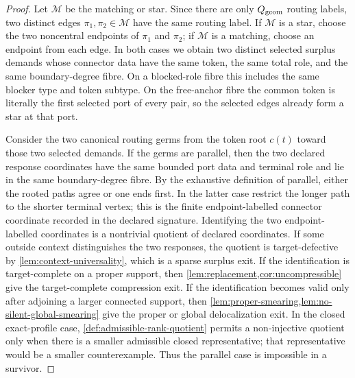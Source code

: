 \documentclass[11pt]{article}
\begin{document}
\begin{proof}
Let \(\mathcal M\) be the matching or star.  Since there are only
\(Q_{\rm geom}\) routing labels, two distinct edges
\(\pi_1,\pi_2\in\mathcal M\) have the same routing label.  If \(\mathcal M\) is
a star, choose the two noncentral endpoints of \(\pi_1\) and \(\pi_2\); if
\(\mathcal M\) is a matching, choose an endpoint from each edge.  In both cases
we obtain two distinct selected surplus demands whose connector data have the
same token, the same total role, and the same boundary-degree fibre.  On a
blocked-role fibre this includes the same blocker type and token subtype.  On
the free-anchor fibre the common token is literally the first selected port
of every pair, so the selected edges already form a star at that port.

Consider the two canonical routing germs from the token root \(c(t)\) toward
those two selected demands.  If the germs are parallel, then the two declared response
coordinates have the same bounded port data and terminal role and lie in the
same boundary-degree fibre.  By the exhaustive definition of parallel, either
the rooted paths agree or one ends first.  In the latter case restrict the
longer path to the shorter terminal vertex; this is the finite
endpoint-labelled connector coordinate recorded in the declared signature.
Identifying the two endpoint-labelled coordinates is a nontrivial quotient of
declared coordinates.  If some outside context distinguishes the two
responses, the quotient is target-defective by
\cref{lem:context-universality}, which is a
sparse surplus exit.  If the identification is target-complete on a proper
support, then \cref{lem:replacement,cor:uncompressible} give the
target-complete compression exit.  If the identification becomes valid only
after adjoining a larger connected support, then
\cref{lem:proper-smearing,lem:no-silent-global-smearing} give the proper or
global delocalization exit.  In the closed exact-profile case,
\cref{def:admissible-rank-quotient} permits a non-injective quotient only when
there is a smaller admissible closed representative; that representative would
be a smaller counterexample.  Thus the parallel case is impossible in a
survivor.


\end{proof}
\end{document}
